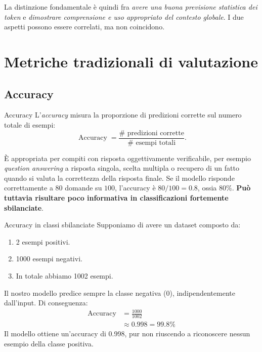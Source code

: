 La distinzione fondamentale è quindi fra \emph{avere una buona previsione statistica dei token} e \emph{dimostrare comprensione e uso appropriato del contesto globale}. I due aspetti possono essere correlati, ma non coincidono.

\section{Metriche tradizionali di valutazione}

\subsection{Accuracy}

\begin{definition}{Accuracy}
L'\emph{accuracy} misura la proporzione di predizioni corrette sul numero totale di esempi:
\begin{equation}
\boxed{\operatorname{Accuracy}=\frac{\#\text{ predizioni corrette}}{\#\text{ esempi totali}}}.
\end{equation}
\end{definition}

È appropriata per compiti con risposta oggettivamente verificabile, per esempio \emph{question answering} a risposta singola, scelta multipla o recupero di un fatto quando si valuta la correttezza della risposta finale. Se il modello risponde correttamente a $80$ domande su $100$, l'accuracy è $80/100=0.8$, ossia $80\%$. \textbf{Può tuttavia risultare poco informativa in classificazioni fortemente sbilanciate}.
\begin{example}{Accuracy in classi sbilanciate}
    Supponiamo di avere un dataset composto da:
    \begin{enumerate}
        \item 2 esempi positivi.
        \item 1000 esempi negativi.
        \item In totale abbiamo 1002 esempi.
    \end{enumerate}
Il nostro modello predice sempre la classe negativa (0), indipendentemente dall'input.
Di conseguenza:
\[
\begin{aligned}
\text{Accuracy}
&=\frac{1000}{1002}\\[4pt]
&\approx 0.998 = 99.8\%
\end{aligned}
\]
Il modello ottiene un'accuracy di 0.998, pur non riuscendo a riconoscere nessun esempio della classe positiva.
\end{example}






